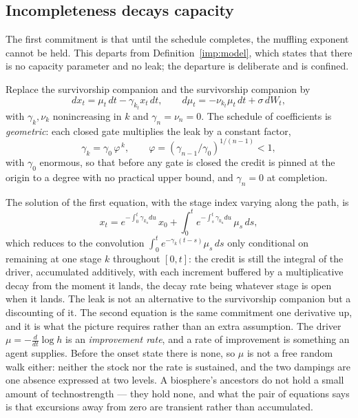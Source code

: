 \subsection{Incompleteness decays capacity}\label{sch:subsub:leak}

The first commitment is that until the schedule completes, the muffling
exponent cannot be held. This departs from
Definition~\ref{imp:model}, which states that there is no capacity
parameter and no leak; the departure is deliberate and is confined.

\begin{definition}\label{sch:def:leak}
Replace the survivorship companion \cite{GoldenSurvivorship} and the survivorship companion \cite{GoldenSurvivorship} by
\begin{equation}\label{sch:eq:leak}
dx_t=\mu_t\,dt-\gamma_{k_t}x_t\,dt,
\qquad
d\mu_t=-\nu_{k_t}\mu_t\,dt+\sigma\,dW_t,
\end{equation}
with $\gamma_k,\nu_k$ nonincreasing in $k$ and $\gamma_n=\nu_n=0$. The
schedule of coefficients is \emph{geometric}: each closed gate
multiplies the leak by a constant factor,
\begin{equation}\label{sch:eq:geomleak}
\gamma_k=\gamma_0\,\varphi^{\,k},\qquad
\varphi=(\gamma_{n-1}/\gamma_0)^{1/(n-1)}<1,
\end{equation}
with $\gamma_0$ enormous, so that before any gate is closed the credit
is pinned at the origin to a degree with no practical upper bound, and $\gamma_n=0$ at completion.
\end{definition}

The solution of the first equation, with the stage index varying along
the path, is
\[
x_t=e^{-\int_0^t\gamma_{k_u}du}\,x_0+\int_0^te^{-\int_s^t\gamma_{k_u}du}\,\mu_s\,ds,
\]
which reduces to the convolution $\int_0^te^{-\gamma_k(t-s)}\mu_s\,ds$
only conditional on remaining at one stage $k$ throughout $[0,t]$: the
credit is still the integral of the driver, accumulated additively,
with each increment buffered by a multiplicative decay from the moment
it lands, the decay rate being whatever stage is open when it lands. The leak is
not an alternative to the survivorship companion \cite{GoldenSurvivorship} but a discounting of it. The second equation is the same commitment one derivative up, and it is
what the picture requires rather than an extra assumption. The driver
$\mu=-\tfrac{d}{dt}\log h$ is an \emph{improvement rate}, and a rate of
improvement is something an agent supplies. Before the onset state there
is none, so $\mu$ is not a free random walk either: neither the stock nor
the rate is sustained, and the two dampings are one absence expressed at
two levels. A biosphere's ancestors do not hold a small amount of
technostrength --- they hold none, and what the pair of equations says is
that excursions away from zero are transient rather than accumulated.

